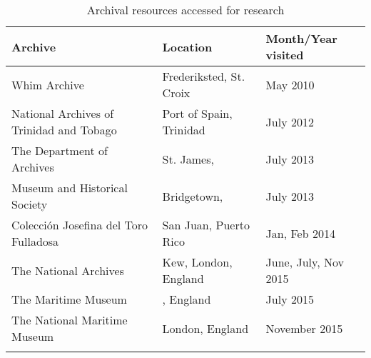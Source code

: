 \begin{table}\begin{tabularx}{\textwidth}{Qll}
\lsptoprule

\textbf{Archive} & \textbf{Location} & \textbf{Month/Year} \textbf{visited}\\
\midrule 
Whim Archive & Frederiksted, St. Croix &  {May 2010}\\
\tablevspace
National Archives of Trinidad and Tobago & Port of Spain, Trinidad &  {July 2012}\\
\tablevspace
The  Department of Archives & St. James,  &  {July 2013}\\
\tablevspace
{} Museum and Historical Society & Bridgetown,  &  {July 2013}\\
\tablevspace
Colección Josefina del Toro Fulladosa & San Juan, Puerto Rico & Jan,  {Feb 2014}\\
\tablevspace
The National Archives & Kew, London, England & June, July,  {Nov 2015}\\
\tablevspace
The  Maritime Museum & , England &  {July 2015}\\
\tablevspace
The National Maritime Museum & London, England &  {November 2015}\\
\lspbottomrule
\end{tabularx}

\caption{\label{tab:key:1.1} Archival resources accessed for research}
\end{table}



